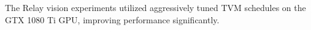   The Relay vision experiments utilized aggressively tuned TVM schedules on the GTX 1080 Ti GPU,
    improving performance significantly.




